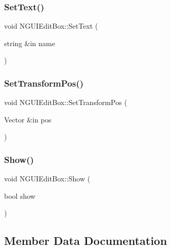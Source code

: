 \hypertarget{class_n_g_u_i_edit_box_a98927379e36a367b3727d5b5aa593a80}{}\label{class_n_g_u_i_edit_box_a98927379e36a367b3727d5b5aa593a80} 
\subsubsection{\texorpdfstring{Set\+Text()}{SetText()}}
{\footnotesize\ttfamily void N\+G\+U\+I\+Edit\+Box\+::\+Set\+Text (\begin{DoxyParamCaption}\item[{string \&in}]{name }\end{DoxyParamCaption})}

\hypertarget{class_n_g_u_i_edit_box_a260c72df791a8fe193a77a74761ce1ea}{}\label{class_n_g_u_i_edit_box_a260c72df791a8fe193a77a74761ce1ea} 
\subsubsection{\texorpdfstring{Set\+Transform\+Pos()}{SetTransformPos()}}
{\footnotesize\ttfamily void N\+G\+U\+I\+Edit\+Box\+::\+Set\+Transform\+Pos (\begin{DoxyParamCaption}\item[{Vector \&in}]{pos }\end{DoxyParamCaption})}

\hypertarget{class_n_g_u_i_edit_box_a317ef28f9a51fe307a0493922ebd372d}{}\label{class_n_g_u_i_edit_box_a317ef28f9a51fe307a0493922ebd372d} 
\subsubsection{\texorpdfstring{Show()}{Show()}}
{\footnotesize\ttfamily void N\+G\+U\+I\+Edit\+Box\+::\+Show (\begin{DoxyParamCaption}\item[{bool}]{show }\end{DoxyParamCaption})}



\subsection{Member Data Documentation}
\hypertarget{class_n_g_u_i_edit_box_a4a2c2c4dff450a19491a2d09299ffa04}{}\label{class_n_g_u_i_edit_box_a4a2c2c4dff450a19491a2d09299ffa04} 

